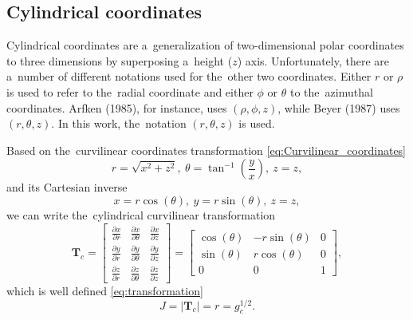 \documentclass[preprint,12pt]{elsarticle}
\newcommand{\pdv}[2]{\frac{\partial{#1}}{\partial{#2}}}
\newcommand{\matr}[1]{\mathbf{#1}}
\begin{document}
\subsection{Cylindrical coordinates}
Cylindrical coordinates are a~generalization of two-dimensional polar 
coordinates to three dimensions by superposing a~height ($z$) axis. 
Unfortunately, there are a~number of different notations used for 
the~other two coordinates. Either  $r$ or $\rho$ is used to refer to 
the~radial coordinate and either $\phi$ or $\theta$ to the~azimuthal 
coordinates. Arfken (1985), for instance, uses $(\rho,\phi,z)$, 
while Beyer (1987) uses $(r,\theta,z)$. 
In this work, the~notation $(r,\theta,z)$ is used.

Based on the~curvilinear coordinates transformation 
\eqref{eq:Curvilinear_coordinates}
\begin{equation}
  r = \sqrt{x^2 + z^2} ,~ 
  \theta = \tan^{-1}\left( \frac{y}{x} \right) ,~ 
  z = z,
  \label{eq:cyl_curvilinear_transformation}
\end{equation}
and its Cartesian inverse
\begin{equation}
  x = r \cos(\theta) ,~ 
  y = r \sin(\theta) ,~ 
  z = z,
  \label{eq:cyl_Cartesian_transformation}
\end{equation}
we can write the~cylindrical curvilinear transformation
\begin{equation}
  \matr{T}_{c} = \begin{bmatrix}
        \pdv{x}{r} & \pdv{x}{\theta} & \pdv{x}{z} \\
        \pdv{y}{r} & \pdv{y}{\theta} & \pdv{y}{z} \\
        \pdv{z}{r} & \pdv{z}{\theta} & \pdv{z}{z} 
	  \end{bmatrix}
  = \begin{bmatrix}
  \cos(\theta) & -r\sin(\theta) & 0 \\
  \sin(\theta) & r\cos(\theta) & 0 \\
  0 & 0 & 1
  \end{bmatrix} ,
  \label{eq:cyl_transformation}
\end{equation}
which is well defined \eqref{eq:transformation}
\begin{equation}
  J = |\matr{T}_{c}| = r = g_c^{1/2}.
  \label{eq:cyl_J}
\end{equation}
\end{document}
